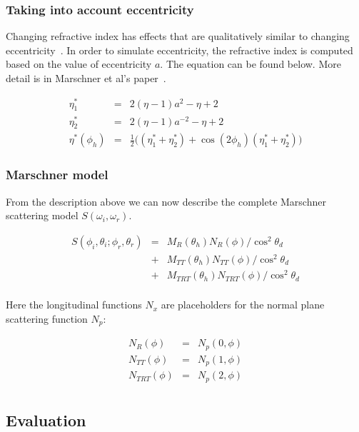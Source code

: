 \documentclass[11pt,a4paper]{report}
\begin{document}
\subsubsection{Taking into account eccentricity}

Changing refractive index has effects that are qualitatively similar to changing eccentricity~\cite{marschner}. In order to simulate eccentricity, the refractive index is computed based on the value of eccentricity $a$. The equation can be found below. More detail is in Marschner et al's paper~\cite{marschner}.

\begin{eqnarray}
\eta_1^* & = & 2(\eta - 1) a^2 - \eta + 2 \\
\eta_2^* & = & 2(\eta - 1) a^{-2} - \eta + 2 \\
\eta^*(\phi_h) & = & \frac{1}{2}\big((\eta_1^* + \eta_2^*)+\cos(2\phi_h)(\eta_1^* + \eta_2^*) \big)
\end{eqnarray}

\subsubsection{Marschner model}

From the description above we can now describe the complete Marschner scattering model $S(\omega_i, \omega_r)$.

\begin{eqnarray*}
S(\phi_i,\theta_i; \phi_r, \theta_r) & = & M_R(\theta_h) N_R(\phi) / \cos^2 \theta_d \\
& + & M_{TT}(\theta_h) N_{TT}(\phi) / \cos^2 \theta_d \\
& + & M_{TRT}(\theta_h) N_{TRT}(\phi) / \cos^2 \theta_d \\
\end{eqnarray*}

Here the longitudinal functions $N_x$ are placeholders for the normal plane scattering function $N_p$:

\begin{eqnarray*}
N_R(\phi) & = & N_p(0, \phi) \\
N_{TT}(\phi) & = & N_p(1, \phi) \\
N_{TRT}(\phi) & = & N_p(2, \phi) \\
\end{eqnarray*}
\subsection{Evaluation}
\end{document}
